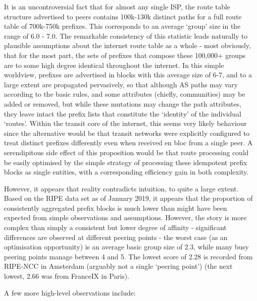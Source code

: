 It is an uncontroversial fact that for almost any single ISP, the route table structure advertised to peers contains 100k-130k distinct paths for a full route table of 700k-750k prefixes. This corresponds to an average `group' size in the range of 6.0 - 7.0. The remarkable consistency of this statistic leads naturally to plausible assumptions about the internet route table as a whole - most obviously, that for the most part, the sets of prefixes that compose these 100,000+ groups are to some high degree identical throughout the internet. In this simple worldview, prefixes are advertised in blocks with this average size of 6-7, and to a large extent are propagated pervasively, so that although AS paths may vary according to the basic rules, and some attributes (chiefly, communities) may be added or removed, but while these mutations may change the path attributes, they leave intact the prefix lists that constitute the `identity' of the individual `routes'. Within the transit core of the internet, this seems very likely behaviour since the alternative would be that transit networks were explicitly configured to treat distinct prefixes differently even when received en bloc from a single peer. A serendipitous side effect of this proposition would be that route processing could be easily optimised by the simple strategy of processing these idempotent prefix blocks as single entities, with a corresponding efficiency gain in both complexity.

However, it appears that reality contradicts intuition, to quite a large extent. Based on the RIPE data set as of January 2019, it appears that the proportion of consistently aggregated prefix blocks is much lower than might have been expected from simple observations and assumptions. However, the story is more complex than simply a consistent but lower degree of affinity - significant differences are observed at different peering points - the worst case (as an optimisation opportunity) is an average basic group size of 2.3, while many busy peering points manage between 4 and 5. The lowest score of 2.28 is recorded from RIPE-NCC in Amsterdam (arguably not a single `peering point') (the next lowest, 2.66 was from FranceIX in Paris).

A few more high-level observations include:

